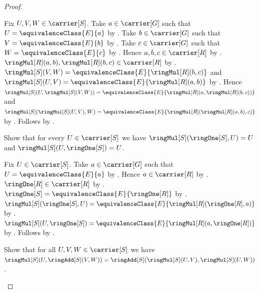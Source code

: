 \begin{proof}
    \begin{subproof}
        Fix $U,V,W\in\carrier[S]$.
        Take $a\in\carrier[G]$ such that
            $U=\equivalenceClass{E}{a}$ by
            .
        Take $b\in\carrier[G]$ such that
            $V=\equivalenceClass{E}{b}$ by
            .
        Take $c\in\carrier[G]$ such that
            $W=\equivalenceClass{E}{c}$ by
            .
        Hence $a,b,c\in\carrier[R]$ by .
        $\ringMul[R](a,b),\ringMul[R](b,c)\in\carrier[R]$ by
            .
        $\ringMul[S](V,W)=\equivalenceClass{E}{\ringMul[R](b,c)}$ and
            $\ringMul[S](U,V)=\equivalenceClass{E}{\ringMul[R](a,b)}$ by
            .
        Hence
            $\ringMul[S](U,\ringMul[S](V,W))
                =\equivalenceClass{E}{
                    \ringMul[R](a,\ringMul[R](b,c))}$ and
            $\ringMul[S](\ringMul[S](U,V),W)
                =\equivalenceClass{E}{
                    \ringMul[R](\ringMul[R](a,b),c)}$ by
            .
        Follows by .
    \end{subproof}
    Show that for every $U\in\carrier[S]$ we have
        $\ringMul[S](\ringOne[S],U)=U$ and
        $\ringMul[S](U,\ringOne[S])=U$.
    \begin{subproof}
        Fix $U\in\carrier[S]$.
        Take $a\in\carrier[G]$ such that
            $U=\equivalenceClass{E}{a}$ by
            .
        Hence $a\in\carrier[R]$ by .
        $\ringOne[R]\in\carrier[R]$ by .
        $\ringOne[S]=\equivalenceClass{E}{\ringOne[R]}$ by
            .
        $\ringMul[S](\ringOne[S],U)
            =\equivalenceClass{E}{\ringMul[R](\ringOne[R],a)}$ by
            .
        $\ringMul[S](U,\ringOne[S])
            =\equivalenceClass{E}{\ringMul[R](a,\ringOne[R])}$ by
            .
        Follows by .
    \end{subproof}
    Show that for all $U,V,W\in\carrier[S]$ we have
        $\ringMul[S](U,\ringAdd[S](V,W))
            =\ringAdd[S](\ringMul[S](U,V),\ringMul[S](U,W))$.
    \begin{subproof}

\end{subproof}
\end{proof}
